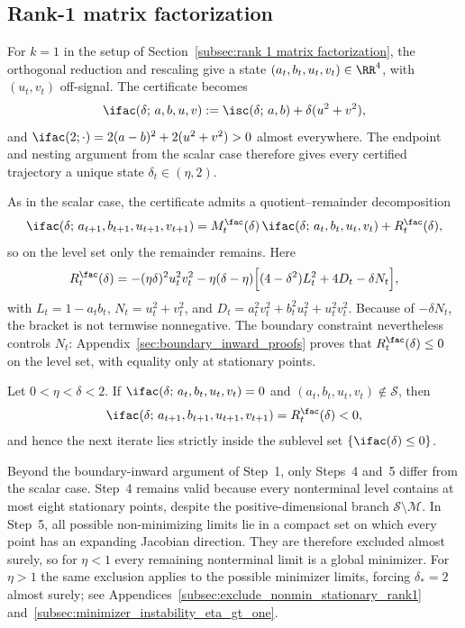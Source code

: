 \documentclass{article}
\begin{document}
\subsection{Rank-1 matrix factorization}
\label{subsec:rank1_gd_general}

For $k=1$ in the setup of
Section~\ref{subsec:rank 1 matrix factorization}, the orthogonal reduction and
rescaling give a state $(a_t,b_t,u_t,v_t)\in\RR^4$, with $(u_t,v_t)$
off-signal. The certificate becomes
\begin{align}
\ifac(\delta;\, a,b,u,v)
:= \isc(\delta;\,a,b) + \delta(u^2+v^2),
\label{eq:I_delta_def}
\end{align}
and $\ifac(2;\cdot)=2(a-b)^2+2(u^2+v^2)>0$ almost everywhere. The endpoint and
nesting argument from the scalar case therefore gives every certified
trajectory a unique state $\delta_t\in(\eta,2)$.

As in the scalar case, the certificate admits a quotient--remainder
decomposition
\begin{align}
\ifac(\delta;\, a_{t+1},b_{t+1},u_{t+1},v_{t+1})
= M_t^\fac(\delta)\,\ifac(\delta;\, a_t,b_t,u_t,v_t) + R_t^\fac(\delta),
\label{eq:I_delta_affine}
\end{align}
so on the level set only the remainder remains. Here
\begin{align}
    R_t^\fac(\delta)
    =
    -(\eta\delta)^2u_t^2v_t^2
    -\eta(\delta-\eta)
    \Bigl[(4-\delta^2)L_t^2+4D_t-\delta N_t\Bigr],
\end{align}
with $L_t=1-a_tb_t$, $N_t=u_t^2+v_t^2$, and
$D_t=a_t^2v_t^2+b_t^2u_t^2+u_t^2v_t^2$. Because of $-\delta N_t$, the bracket
is not termwise nonnegative. The boundary constraint nevertheless controls
$N_t$: Appendix~\ref{sec:boundary_inward_proofs} proves that
$R_t^\fac(\delta)\le0$ on the level set, with equality only at stationary
points.

\begin{proposition}\label{prop:boundary_inward_rank1}
Let $0 < \eta < \delta < 2$.
If $\ifac(\delta;\, a_t,b_t,u_t,v_t) = 0$ and $(a_t,b_t,u_t,v_t) \notin \mathcal{S}$, then
\begin{align}
\ifac(\delta;\, a_{t+1},b_{t+1},u_{t+1},v_{t+1}) = R_t^\fac(\delta) < 0,
\end{align}
and hence the next iterate lies strictly inside the sublevel set $\{\ifac(\delta) \le 0\}$.
\end{proposition}

Beyond the boundary-inward argument of Step~1, only Steps~4 and~5 differ from
the scalar case. Step~4 remains valid because every nonterminal level contains
at most eight stationary points, despite the positive-dimensional branch
$\mathcal S\setminus\mathcal M$. In Step~5, all possible non-minimizing limits
lie in a compact set on which every point has an expanding Jacobian direction.
They are therefore excluded almost surely, so for $\eta<1$ every remaining
nonterminal limit is a global minimizer. For $\eta>1$ the same exclusion
applies to the possible minimizer limits, forcing $\delta_\ast=2$ almost
surely; see
Appendices~\ref{subsec:exclude_nonmin_stationary_rank1}
and~\ref{subsec:minimizer_instability_eta_gt_one}.
\end{document}
